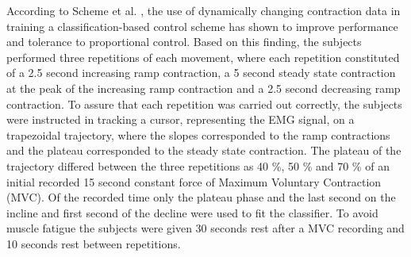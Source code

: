 According to Scheme et al. \cite{Scheme2015}, the use of dynamically changing contraction data in training a classification-based control scheme has shown to improve performance and tolerance to proportional control. Based on this finding, the subjects performed three repetitions of each movement, where each repetition constituted of a 2.5 second increasing ramp contraction, a 5 second steady state contraction at the peak of the increasing ramp contraction and a 2.5 second decreasing ramp contraction. To assure that each repetition was carried out correctly, the subjects were instructed in tracking a cursor, representing the EMG signal, on a trapezoidal trajectory, where the slopes corresponded to the ramp contractions and the plateau corresponded to the steady state contraction. The plateau of the trajectory differed between the three repetitions as 40 \%, 50 \% and 70 \% of an initial recorded 15 second constant force of Maximum Voluntary Contraction (MVC). Of the recorded time only the plateau phase and the last second on the incline and first second of the decline were used to fit the classifier. To avoid muscle fatigue the subjects were given 30 seconds rest after a MVC recording and 10 seconds rest between repetitions. 

